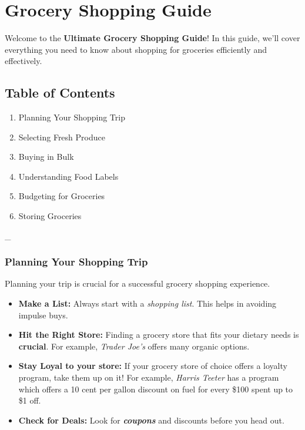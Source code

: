 \documentclass{article}
\begin{document}
    \pagestyle{empty}

\section{Grocery Shopping Guide}


Welcome to the \textbf{Ultimate Grocery Shopping Guide}! In this guide, we'll cover everything you need to know about shopping for groceries efficiently and effectively.


\subsection{Table of Contents}


\begin{enumerate}
    \item Planning Your Shopping Trip
    \item Selecting Fresh Produce
    \item Buying in Bulk
    \item Understanding Food Labels
    \item Budgeting for Groceries
    \item Storing Groceries
\end{enumerate}


\_\hrulefill


\subsubsection{Planning Your Shopping Trip}


Planning your trip is crucial for a successful grocery shopping experience.


\begin{itemize}
    \item  \textbf{Make a List:} Always start with a \textit{shopping list}. This helps in avoiding impulse buys.
    \item  \textbf{Hit the Right Store:} Finding a grocery store that fits your dietary needs is \textbf{crucial}. For example, \textit{Trader Joe's} offers many organic options.
    \item  \textbf{Stay Loyal to your store:} If your grocery store of choice offers a loyalty program, take them up on it! For example, \textit{Harris Teeter} has a program which offers a 10 cent per gallon discount on fuel for every \$100 spent up to \$1 off.
    \item  \textbf{Check for Deals:} Look for \textit{\textbf{coupons}} and discounts before you head out.
\end{itemize}
\end{document}
